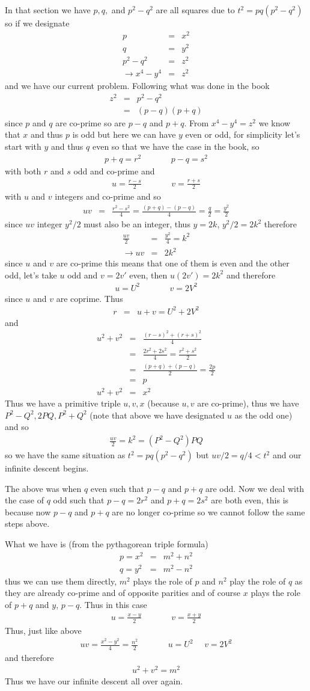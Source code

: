 \documentclass[aps,preprint,preprintnumbers,nofootinbib,showpacs,prd]{revtex4-1}
\newcommand{\nbea}{\begin{eqnarray*}}
\newcommand{\neea}{\end{eqnarray*}}
\begin{document}
In that section we have $p,q,$ and $p^2 - q^2$ are all squares due to $t^2 = pq(p^2-q^2)$ so if we designate
%
\nbea
p & = & x^2 \\
q & = & y^2 \\
p^2 - q^2 & = & z^2 \\
\to x^4 - y^4 & = & z^2
\neea
%
and we have our current problem. Following what was done in the book
%
\nbea
z^2 & = & p^2 - q^2 \\
& = & (p-q)(p+q)
\neea
%
since $p$ and $q$ are co-prime so are $p-q$ and $p+q$. From $x^4 - y^4 = z^2$ we know that $x$ and thus $p$ is odd but here we can have $y$ even or odd, for simplicity let's start with $y$ and thus $q$ even so that we have the case in the book, so
%
\nbea
p + q = r^2  ~~~~~~~~~~~~~~~~ p - q = s^2
\neea
%
with both $r$ and $s$ odd and co-prime and
%
\nbea
u = \frac{r - s}{2}   ~~~~~~~~~~~~~~~~ v = \frac{r + s}{2}
\neea
%
with $u$ and $v$ integers and co-prime and so
%
\nbea
uv & = & \frac{r^2 - s^2}{4} = \frac{(p+q)-(p-q)}{4} = \frac{q}{2} = \frac{y^2}{2}
\neea
%
since $uv$ integer $y^2/2$ must also be an integer, thus $y = 2k$, $y^2/2 = 2k^2$ therefore
%
\nbea
\frac{uv}{2} & = & \frac{y^2}{4} = k^2 \\
\to uv & = & 2k^2
\neea
%
since $u$ and $v$ are co-prime this means that one of them is even and the other odd, let's take $u$ odd and $v=2v'$ even, then $u(2v') = 2k^2$ and therefore
%
\nbea
u = U^2   ~~~~~~~~~~~~~~~~ v = 2 V^2
\neea
%
since $u$ and $v$ are coprime. Thus
%
\nbea
r & = & u + v = U^2 + 2V^2
\neea
%
and 
%
\nbea
u^2 + v^2 & = & \frac{(r-s)^2 + (r+s)^2}{4} \\
& = & \frac{2r^2 + 2s^2}{4} = \frac{r^2 + s^2}{2} \\
& = & \frac{(p+q) + (p-q)}{2} = \frac{2p}{2} \\
& = & p \\
u^2 + v^2 & = & x^2
\neea
%
Thus we have a primitive triple $u,v,x$ (because $u,v$ are co-prime), thus we have $P^2-Q^2,2PQ,P^2+Q^2$ (note that above we have designated $u$ as the odd one) and so
%
\nbea
\frac{uv}{2} = k^2 = (P^2 - Q^2)PQ
\neea
%
so we have the same situation as $t^2 = pq(p^2-q^2)$ but $uv/2 = q/4 < t^2$ and our infinite descent begins.

The above was when $q$ even such that $p-q$ and $p+q$ are odd. Now we deal with the case of $q$ odd such that $p-q = 2r^2$ and $p+q = 2s^2$ are both even, this is because now $p-q$ and $p+q$ are no longer co-prime so we cannot follow the same steps above.

What we have is (from the pythagorean triple formula)
%
\nbea
p = x^2 & = & m^2 + n ^2 \\
q = y^2 & = & m^2 - n^2
\neea
%
thus we can use them directly, $m^2$ plays the role of $p$ and $n^2$ play the role of $q$ as they are already co-prime and of opposite parities and of course $x$ plays the role of $p+q$ and $y$, $p-q$. Thus in this case
%
\nbea
u = \frac{x-y}{2} ~~~~~~~~~~~~~~~~ v = \frac{x+y}{2}
\neea
%
Thus, just like above
%
\nbea
uv = \frac{x^2 - y^2}{4} = \frac{n^2}{2} ~~~~~~~~~~~~~~~~ u = U^2 ~~~~~~ v = 2V^2
\neea
%
and therefore
%
\nbea
u^2 + v^2 = m^2
\neea
%
Thus we have our infinite descent all over again.
\end{document}
